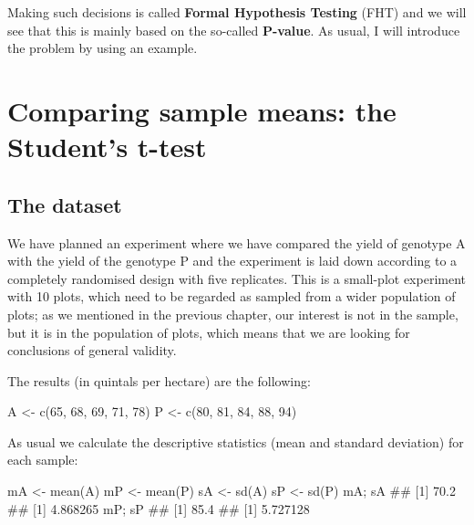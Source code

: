 \documentclass[a4paper,12pt,oneside]{book}
\newenvironment{Shaded}{\begin{snugshade}}{\end{snugshade}}
\newcommand{\DecValTok}[1]{#1}
\newcommand{\DocumentationTok}[1]{#1}
\newcommand{\OtherTok}[1]{#1}
\newcommand{\FunctionTok}[1]{#1}
\newcommand{\NormalTok}[1]{#1}
\begin{document}
Making such decisions is called \textbf{Formal Hypothesis Testing} (FHT) and we will see that this is mainly based on the so-called \textbf{P-value}. As usual, I will introduce the problem by using an example.

\hypertarget{comparing-sample-means-the-students-t-test}{%
\section{Comparing sample means: the Student's t-test}\label{comparing-sample-means-the-students-t-test}}

\hypertarget{the-dataset}{%
\subsection{The dataset}\label{the-dataset}}

We have planned an experiment where we have compared the yield of genotype A with the yield of the genotype P and the experiment is laid down according to a completely randomised design with five replicates. This is a small-plot experiment with 10 plots, which need to be regarded as sampled from a wider population of plots; as we mentioned in the previous chapter, our interest is not in the sample, but it is in the population of plots, which means that we are looking for conclusions of general validity.

The results (in quintals per hectare) are the following:

\begin{Shaded}
\begin{Highlighting}[]
\NormalTok{A }\OtherTok{\textless{}{-}} \FunctionTok{c}\NormalTok{(}\DecValTok{65}\NormalTok{, }\DecValTok{68}\NormalTok{, }\DecValTok{69}\NormalTok{, }\DecValTok{71}\NormalTok{, }\DecValTok{78}\NormalTok{)}
\NormalTok{P }\OtherTok{\textless{}{-}} \FunctionTok{c}\NormalTok{(}\DecValTok{80}\NormalTok{, }\DecValTok{81}\NormalTok{, }\DecValTok{84}\NormalTok{, }\DecValTok{88}\NormalTok{, }\DecValTok{94}\NormalTok{)}
\end{Highlighting}
\end{Shaded}

As usual we calculate the descriptive statistics (mean and standard deviation) for each sample:

\begin{Shaded}
\begin{Highlighting}[]
\NormalTok{mA }\OtherTok{\textless{}{-}} \FunctionTok{mean}\NormalTok{(A)}
\NormalTok{mP }\OtherTok{\textless{}{-}} \FunctionTok{mean}\NormalTok{(P)}
\NormalTok{sA }\OtherTok{\textless{}{-}} \FunctionTok{sd}\NormalTok{(A)}
\NormalTok{sP }\OtherTok{\textless{}{-}} \FunctionTok{sd}\NormalTok{(P)}
\NormalTok{mA; sA}
\DocumentationTok{\#\# [1] 70.2}
\DocumentationTok{\#\# [1] 4.868265}
\NormalTok{mP; sP}
\DocumentationTok{\#\# [1] 85.4}
\DocumentationTok{\#\# [1] 5.727128}
\end{Highlighting}
\end{Shaded}
\end{document}
